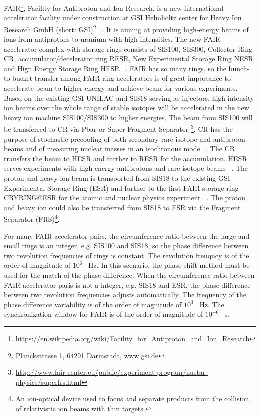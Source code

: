 FAIR\footnote{\url{https://en.wikipedia.org/wiki/Facility_for_Antiproton_and_Ion_Research}}, Facility for Antiproton and Ion Research, is a new international accelerator facility under construction at GSI Helmholtz center for Heavy Ion Research GmbH (short: GSI)\footnote{Planckstrasse 1, 64291 Darmstadt, www.gsi.de} ~\cite{eschke_international_2005, _fair_2011}. It is aiming at providing high-energy beams of ions from antiprotons to uranium with high intensities. The new FAIR accelerator complex with storage rings consists of SIS100, SIS300, Collector Ring CR, accumulator/decelerator ring RESR, New Experimental Storage Ring NESR and Hign Energy Storage Ring HESR ~\cite{spiller_fair_2006, steck_advanced_2008}. FAIR has so many rings, so the bunch-to-bucket transfer among FAIR ring accelerators is of great importance to accelerate beam to higher energy and achieve beam for various experiments. Based on the existing GSI \gls{UNILAC} and SIS18 serving as injectors, high intensity ion beams over the whole range of stable isotopes will be accelerated in the new heavy ion machine SIS100/SIS300 to higher energies. The beam from SIS100 will be transferred to CR via Pbar or Super-Fragment Separator \footnote{\url{http://www.fair-center.eu/public/experiment-program/nustar-physics/superfrs.html}}. CR has the purpose of stochastic precooling of both secondary rare isotope and antiproton beams and of measuring nuclear masses in an isochronous mode ~\cite{nolden_collector_2006, abe_technical_2010}. The CR transfers the beam to HESR and further to RESR for the accumulation. HESR serves experiments with high energy antiprotons and rare isotope beams ~\cite{toelle_hesr_2007}. The proton and heavy ion beam is transported from SIS18 to the existing GSI Experimental Storage Ring (ESR) and further to the first FAIR-storage ring CRYRING@ESR for the atomic and nuclear physics experiment ~\cite{lestinsky_cryring_2015, lestinsky_cryring_2012}. The proton and heavy ion could also be transferred from SIS18 to ESR via the Fragment Separator (\gls{FRS})\footnote{An ion-optical device used to focus and separate products from the collision of relativistic ion beams with thin targets.}.

For many FAIR accelerator pairs, the circumference ratio between the large and small rings is an integer, e.g. SIS100 and SIS18, so the phase difference between two revolution frequencies of rings is constant. The revolution freuqncy is of the order of magnitude of $10^6$  \SI{}{Hz}. In this scenario, the phase shift method must be used for the match of the phase difference. When the circumference ratio between FAIR accelerator paris is not a integer, e.g. SIS18 and ESR, the phase difference between two revolution frequencies adjusts automatically. The frequency of the phase difference variability is of the order of magnitude of $10^3$  \SI{}{Hz}. The synchronization window for FAIR is of the order of magnitude of $10^{-6}$ \SI{}{s}.

